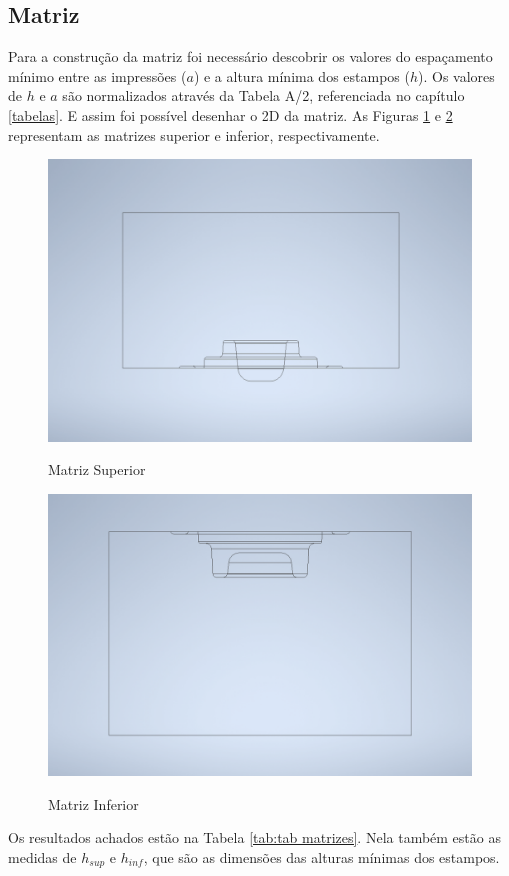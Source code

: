 \documentclass[deposito, acronym, symbols]{fei}
\begin{document}
\newpage
\subsection{Matriz} \label{Matriz}

Para a construção da matriz foi necessário descobrir os valores do espaçamento mínimo entre as impressões ($a$) e a altura mínima dos estampos ($h$). Os valores de $h$ e $a$ são normalizados através da Tabela A/2, referenciada no capítulo \ref{tabelas}. E assim foi possível desenhar o 2D da matriz. As Figuras \ref{fig:matrizsup} e \ref{fig:matrizinf} representam as matrizes superior e inferior, respectivamente. 

\begin{figure}[!htp]
    \centering
    \caption{Matriz Superior}
    \includegraphics[width=0.6\linewidth]{Imagens/Matriz Superior - Grupo 6.png}
    \label{fig:matrizsup}
\end{figure}


\begin{figure}[!htp]
    \centering
    \caption{Matriz Inferior}
    \includegraphics[width=0.6\linewidth]{Imagens/Matriz Inferior - Grupo 6.png}
    \label{fig:matrizinf}
\end{figure}

Os resultados achados estão na Tabela \ref{tab:tab matrizes}. Nela também estão as medidas de $h_{sup}$ e $h_{inf}$, que são as dimensões das alturas mínimas dos estampos. 
\end{document}
